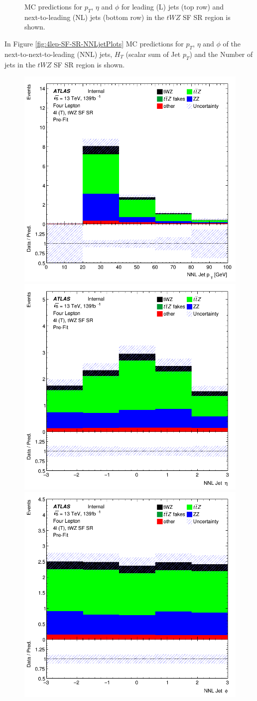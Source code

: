 \begin{figure}[htbp]
\begin{tabular}{ccc}
  \end{tabular}
    \caption{MC predictions for $p_{T}$, $\eta$ and $\phi$ for leading (L) jets (top row) and next-to-leading (NL) jets (bottom row) in the $tWZ$ SF SR region  is shown.}
    \label{fig:4lep-SF-SR-LandNjetPlots} 
\end{figure}

In Figure \ref{fig:4lep-SF-SR-NNLjetPlots} MC predictions for $p_{T}$, $\eta$ and $\phi$ of the next-to-next-to-leading (NNL) jets, $H_{T}$ (scalar sum of Jet $p_{T}$) and the Number of jets in the $tWZ$ SF SR region is shown.


\begin{figure}[htbp]
 \centering


    \includegraphics[width=.3\textwidth]{figures/PreFitPlots/lep4_tWZ_4T_SF_NNLJet_pt.png} \quad
    \includegraphics[width=.3\textwidth]{figures/PreFitPlots/lep4_tWZ_4T_SF_NNLJet_eta.png} \quad
    \includegraphics[width=.3\textwidth]{figures/PreFitPlots/lep4_tWZ_4T_SF_NNLJet_phi.png}

    \medskip


\end{figure}
